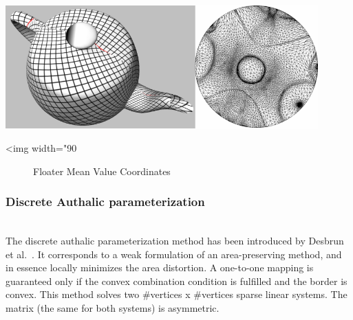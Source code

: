 \begin{center}
    \label{Surface_mesh_parameterization-fig-floater}
    \begin{ccTexOnly}
      \includegraphics[width=0.9\textwidth]{Surface_mesh_parameterization/floater}
    \end{ccTexOnly}
    \begin{ccHtmlOnly}
        <img width="90%
    \end{ccHtmlOnly}
    \begin{figure}[h]
        \caption{Floater Mean Value Coordinates}
    \end{figure}
\end{center}

\subsubsection{Discrete Authalic parameterization}

  \\

The discrete authalic parameterization method has been introduced by
Desbrun et al.~\cite{cgal:dma-ipsm-02}. It corresponds to
a weak formulation of an area-preserving method, and in essence
locally minimizes the area distortion. A one-to-one mapping is
guaranteed only if the convex combination condition is fulfilled and
the border is convex. This method solves two
\#vertices x \#vertices sparse linear systems. The matrix (the same
for both systems) is asymmetric.

